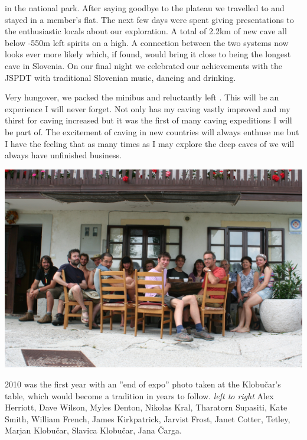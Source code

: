 in the
national park. After saying goodbye to the plateau we travelled to  and stayed in a member's
flat. The next few days were spent giving presentations to the enthusiastic locals about our exploration. A total of 2.2km of new cave all below -550m left spirits on a high. A connection between the two
systems now looks ever more likely which, if found, would bring it close to being the longest cave in
Slovenia. On our final night we celebrated our achievements with the JSPDT with traditional Slovenian
music, dancing and drinking.



Very hungover, we packed the minibus and reluctantly left . This will be an experience I
will never forget. Not only has my caving vastly improved and my thirst for caving increased but it
was the first of many caving expeditions I will be part of. The excitement of caving in new countries
will always enthuse me but I have the feeling that as many times as I may explore the deep caves of
 we will always have unfinished business.




\begin{pagefigure}
\checkoddpage \ifoddpage \forcerectofloat \else \forceversofloat \fi
   \centering
\includegraphics[width = \textwidth]{2010/ap_awards/20100813-14-58-03 - Jana Carga 64--crop-orig.jpg}
\caption{2010 was the first year with an ''end of expo'' photo taken at the Klobučar's table, which would become a tradition in years to follow. \textit{left to right} Alex Herriott, Dave Wilson, Myles Denton, Nikolas Kral, Tharatorn Supasiti, Kate Smith, William French, James Kirkpatrick, Jarvist Frost, Janet Cotter, Tetley, Marjan Klobučar, Slavica Klobučar, Jana Čarga. } \label{Klobučar 2010}
\end{pagefigure}